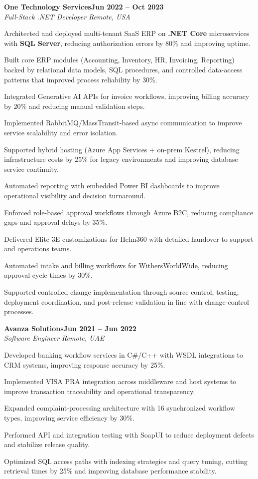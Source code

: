\documentclass[letterpaper,10pt]{article}
\newcommand{\headingBf}[2]{
  \hspace{10pt}\textbf{#1}\hfill\textbf{#2}\\
}
\newcommand{\headingIt}[2]{
  \hspace{10pt}\textit{#1}\hfill\textit{#2}\\
}
\newenvironment{resume_list}{
  \vspace{-7pt}
  \begin{itemize}[itemsep=-2px, parsep=1pt, leftmargin=30pt]
}{
  \end{itemize}
}
\begin{document}
\headingBf{One Technology Services}{Jun 2022 -- Oct 2023}
\headingIt{Full-Stack .NET Developer \hfill Remote, USA}{}
\begin{resume_list}
    \item Architected and deployed multi-tenant SaaS ERP on \textbf{.NET Core} microservices with \textbf{SQL Server}, reducing authorization errors by 80\% and improving uptime.
    \item Built core ERP modules (Accounting, Inventory, HR, Invoicing, Reporting) backed by relational data models, SQL procedures, and controlled data-access patterns that improved process reliability by 30\%.
    \item Integrated Generative AI APIs for invoice workflows, improving billing accuracy by 20\% and reducing manual validation steps.
    \item Implemented RabbitMQ/MassTransit-based async communication to improve service scalability and error isolation.
    \item Supported hybrid hosting (Azure App Services + on-prem Kestrel), reducing infrastructure costs by 25\% for legacy environments and improving database service continuity.
    \item Automated reporting with embedded Power BI dashboards to improve operational visibility and decision turnaround.
    \item Enforced role-based approval workflows through Azure B2C, reducing compliance gaps and approval delays by 35\%.
    \item Delivered Elite 3E customizations for Helm360 with detailed handover to support and operations teams.
    \item Automated intake and billing workflows for WithersWorldWide, reducing approval cycle times by 30\%.
    \item Supported controlled change implementation through source control, testing, deployment coordination, and post-release validation in line with change-control processes.
\end{resume_list}

\headingBf{Avanza Solutions}{Jun 2021 -- Jun 2022}
\headingIt{Software Engineer \hfill Remote, UAE}{}
\begin{resume_list}
    \item Developed banking workflow services in C\#/C++ with WSDL integrations to CRM systems, improving response accuracy by 25\%.
    \item Implemented VISA PRA integration across middleware and host systems to improve transaction traceability and operational transparency.
    \item Expanded complaint-processing architecture with 16 synchronized workflow types, improving service efficiency by 30\%.
    \item Performed API and integration testing with SoapUI to reduce deployment defects and stabilize release quality.
    \item Optimized SQL access paths with indexing strategies and query tuning, cutting retrieval times by 25\% and improving database performance stability.
\end{resume_list}
\end{document}
